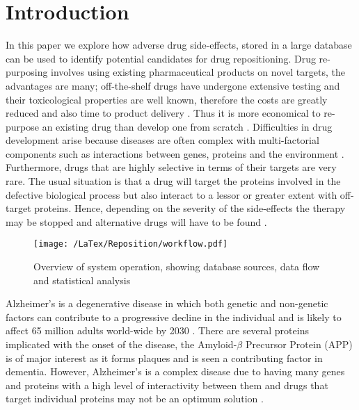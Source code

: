\documentclass[preprint,12pt]{elsarticle}
\begin{document}
\section{Introduction}
In this paper we explore how adverse drug side-effects, stored in a large database can be used to identify potential candidates for drug repositioning. Drug re-purposing involves using existing pharmaceutical products on novel targets, the advantages are many; off-the-shelf drugs have undergone extensive testing and their toxicological properties are well known, therefore the costs are greatly reduced and also time to product delivery \cite{Liu2014}. Thus it is more economical to re-purpose an existing drug than develop one from scratch \cite{Dudley2011}.  Difficulties in drug development arise because diseases are often complex with multi-factorial components such as interactions between genes, proteins and the environment \cite{Barrenas2009}. Furthermore, drugs that are highly selective in terms of their targets are very rare. The usual situation is that a drug will target the proteins involved in the defective biological process but also interact to a lessor or greater extent with off-target proteins\cite{Yang2014,Bisgin2012}. Hence, depending on the severity of the side-effects the therapy may be stopped and alternative drugs will have to be found \cite{Wang2013,Brouwers2011}.  

\begin{figure*}[h]
  \begin{center}
	 \texttt{[image: /LaTex/Reposition/workflow.pdf]} %
  \end{center}
 \caption{Overview of system operation, showing database sources, data flow and statistical analysis}
\label{system}
\end{figure*}

Alzheimer’s is a degenerative disease in which both genetic and non-genetic factors can contribute to a progressive decline in the individual and is likely to affect 65 million adults world-wide by 2030 \cite{Bandyopadhyay2014}.  There are several proteins implicated with the onset of the disease, the Amyloid-$\beta$ Precursor Protein (APP) is of major interest as it forms plaques and is seen a contributing factor in dementia. However, Alzheimer’s is a complex disease due to having many genes and proteins with a high level of interactivity between them and drugs that target individual proteins may not be an optimum solution \cite{Re2013,Oh2014}. 
 
\end{document}
